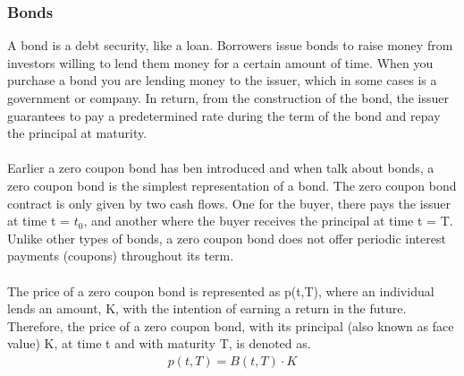 \subsubsection{Bonds}
A bond is a debt security, like a loan. Borrowers issue bonds to raise money 
from investors willing to lend them money for a certain amount of time.
When you purchase a bond you are lending money to the issuer, which in 
some cases is a government or company. In return, from the construction of the 
bond, the issuer guarantees to pay a predetermined rate during the term of the bond
and repay the principal at maturity. 
\\\\
Earlier a zero coupon bond has ben introduced and when talk about bonds, a zero coupon 
bond is the simplest representation of a bond. The zero coupon bond contract is 
only given by two cash flows. One for the buyer, there pays the issuer at time 
t = $t_0$, and another where the buyer receives the principal at time t = T.
Unlike other types of bonds, a zero coupon bond does not offer periodic 
interest payments (coupons) throughout its term. \cite{Bjork} 
\\\\
The price of a zero coupon bond is represented as 
p(t,T), where an individual lends an amount, K, with the intention of earning a
return in the future. Therefore, the price of a zero coupon bond, with 
its principal (also known as face value) K, at time t and with maturity 
T, is denoted as.
\begin{align*}
    p(t,T)= B(t,T)\cdot K
\end{align*}
